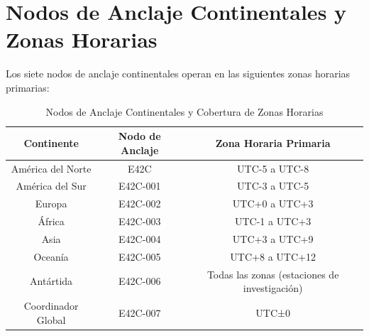 \documentclass[12pt]{article}
\begin{document}
\section{Nodos de Anclaje Continentales y Zonas Horarias}

Los siete nodos de anclaje continentales operan en las siguientes zonas horarias primarias:

\begin{table}[h]
\centering
\begin{tabular}{|c|c|c|}
\hline
\textbf{Continente} & \textbf{Nodo de Anclaje} & \textbf{Zona Horaria Primaria} \\
\hline
América del Norte & E42C & UTC-5 a UTC-8 \\
\hline
América del Sur & E42C-001 & UTC-3 a UTC-5 \\
\hline
Europa & E42C-002 & UTC+0 a UTC+3 \\
\hline
África & E42C-003 & UTC-1 a UTC+3 \\
\hline
Asia & E42C-004 & UTC+3 a UTC+9 \\
\hline
Oceanía & E42C-005 & UTC+8 a UTC+12 \\
\hline
Antártida & E42C-006 & Todas las zonas (estaciones de investigación) \\
\hline
Coordinador Global & E42C-007 & UTC±0 \\
\hline
\end{tabular}
\caption{Nodos de Anclaje Continentales y Cobertura de Zonas Horarias}
\end{table}
\end{document}
